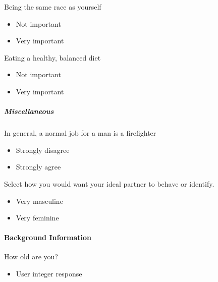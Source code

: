 \begin{multicols}{2}
 Being the same race as yourself

 \begin{itemize}
  \item
        Not important
 \end{itemize}

 \begin{itemize}
  \item
        Very important
 \end{itemize}

 Eating a healthy, balanced diet

 \begin{itemize}
  \item
        Not important
 \end{itemize}

 \begin{itemize}
  \item
        Very important
 \end{itemize}

 \subparagraph{Miscellaneous}

 In general, a normal job for a man is a firefighter

 \begin{itemize}
  \item
        Strongly disagree
 \end{itemize}

 \begin{itemize}
  \item
        Strongly agree
 \end{itemize}

 Select how you would want your ideal partner to behave or identify.

 \begin{itemize}
  \item
        Very masculine
 \end{itemize}

 \begin{itemize}
  \item
        Very feminine
 \end{itemize}

 \paragraph{Background Information}

 How old are you?

 \begin{itemize}
  \item
        User integer response
 \end{itemize}


\end{multicols}

